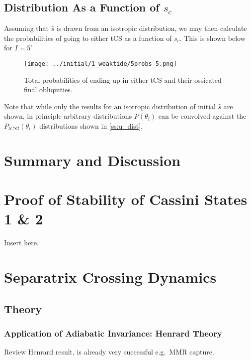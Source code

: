 \documentclass[
        fleqn,
        usenatbib,
        referee,
    ]{mnras}
\newcommand*{\p}[1]{\left(#1\right)}
\begin{document}
\subsection{Distribution As a Function of $s_c$}\label{ss:s_c_dist}

Assuming that $\hat{s}$ is drawn from an isotropic distribution, we may then
calculate the probabilities of going to either tCS as a function of $s_c$. This
is shown below for $I = 5^\circ$
\begin{figure}[t]
    \centering
    \texttt{[image: ../initial/1\_weaktide/5probs\_5.png]}
    \caption{Total probabilities of ending up in either tCS and their ossicated
    final obliquities.}\label{fig:probs}
\end{figure}

Note that while only the results for an isotropic distribution of initial
$\hat{s}$ are shown, in principle arbitrary distributions $P\p{\theta_i}$ can be
convolved against the $P_{tCS2}\p{\theta_i}$ distributions shown in
\autoref{ss:q_dist}.

\section{Summary and Discussion}\label{s:summary}




\appendix
\section{Proof of Stability of Cassini States 1 \& 2}\label{app:cs_stab}

Insert here.

\section{Separatrix Crossing Dynamics}

\subsection{Theory}\label{app:sep_crossing_dynamics}

\subsubsection{Application of Adiabatic Invariance: Henrard Theory}

Review Henrard result, is already very successful e.g.\ MMR capture.
\end{document}

